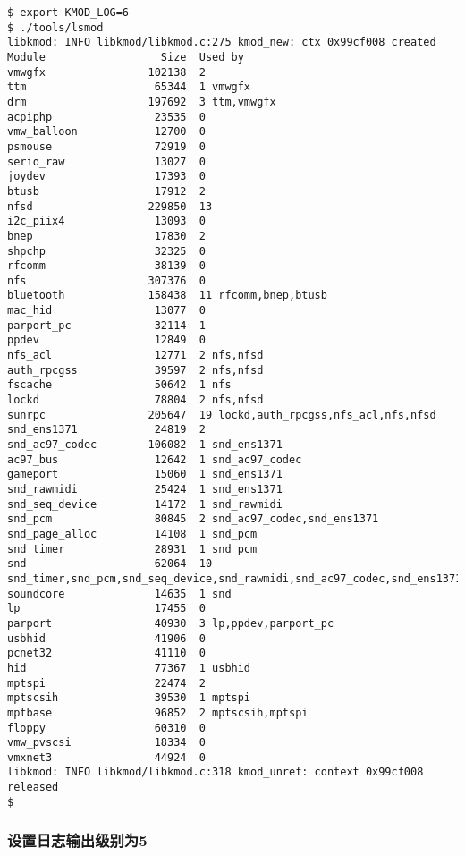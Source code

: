 \documentclass[11pt,a4paper]{article}
\begin{document}
{\begin{shaded}\begin{verbatim}
$ export KMOD_LOG=6
$ ./tools/lsmod 
libkmod: INFO libkmod/libkmod.c:275 kmod_new: ctx 0x99cf008 created
Module                  Size  Used by
vmwgfx                102138  2 
ttm                    65344  1 vmwgfx
drm                   197692  3 ttm,vmwgfx
acpiphp                23535  0 
vmw_balloon            12700  0 
psmouse                72919  0 
serio_raw              13027  0 
joydev                 17393  0 
btusb                  17912  2 
nfsd                  229850  13 
i2c_piix4              13093  0 
bnep                   17830  2 
shpchp                 32325  0 
rfcomm                 38139  0 
nfs                   307376  0 
bluetooth             158438  11 rfcomm,bnep,btusb
mac_hid                13077  0 
parport_pc             32114  1 
ppdev                  12849  0 
nfs_acl                12771  2 nfs,nfsd
auth_rpcgss            39597  2 nfs,nfsd
fscache                50642  1 nfs
lockd                  78804  2 nfs,nfsd
sunrpc                205647  19 lockd,auth_rpcgss,nfs_acl,nfs,nfsd
snd_ens1371            24819  2 
snd_ac97_codec        106082  1 snd_ens1371
ac97_bus               12642  1 snd_ac97_codec
gameport               15060  1 snd_ens1371
snd_rawmidi            25424  1 snd_ens1371
snd_seq_device         14172  1 snd_rawmidi
snd_pcm                80845  2 snd_ac97_codec,snd_ens1371
snd_page_alloc         14108  1 snd_pcm
snd_timer              28931  1 snd_pcm
snd                    62064  10 snd_timer,snd_pcm,snd_seq_device,snd_rawmidi,snd_ac97_codec,snd_ens1371
soundcore              14635  1 snd
lp                     17455  0 
parport                40930  3 lp,ppdev,parport_pc
usbhid                 41906  0 
pcnet32                41110  0 
hid                    77367  1 usbhid
mptspi                 22474  2 
mptscsih               39530  1 mptspi
mptbase                96852  2 mptscsih,mptspi
floppy                 60310  0 
vmw_pvscsi             18334  0 
vmxnet3                44924  0 
libkmod: INFO libkmod/libkmod.c:318 kmod_unref: context 0x99cf008 released
$ 
\end{verbatim}\end{shaded}}
\subsubsection{设置日志输出级别为5}
\end{document}
